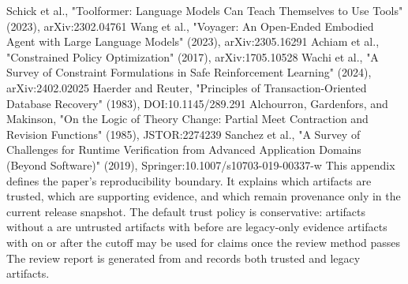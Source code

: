 \markdownRendererUlItem Schick et al., "Toolformer: Language Models Can Teach Themselves to Use Tools" (2023), arXiv:2302.04761\markdownRendererUlItemEnd 
\markdownRendererUlItem Wang et al., "Voyager: An Open-Ended Embodied Agent with Large Language Models" (2023), arXiv:2305.16291\markdownRendererUlItemEnd 
\markdownRendererUlItem Achiam et al., "Constrained Policy Optimization" (2017), arXiv:1705.10528\markdownRendererUlItemEnd 
\markdownRendererUlItem Wachi et al., "A Survey of Constraint Formulations in Safe Reinforcement Learning" (2024), arXiv:2402.02025\markdownRendererUlItemEnd 
\markdownRendererUlItem Haerder and Reuter, "Principles of Transaction-Oriented Database Recovery" (1983), DOI:10.1145/289.291\markdownRendererUlItemEnd 
\markdownRendererUlItem Alchourron, Gardenfors, and Makinson, "On the Logic of Theory Change: Partial Meet Contraction and Revision Functions" (1985), JSTOR:2274239\markdownRendererUlItemEnd 
\markdownRendererUlItem Sanchez et al., "A Survey of Challenges for Runtime Verification from Advanced Application Domains (Beyond Software)" (2019), Springer:10.1007/s10703-019-00337-w\markdownRendererUlItemEnd 
\markdownRendererUlEndTight \markdownRendererInterblockSeparator
{}
\markdownRendererSectionEnd \markdownRendererSectionBegin
{}\markdownRendererInterblockSeparator
{}This appendix defines the paper's reproducibility boundary.\markdownRendererSoftLineBreak
{}It explains which artifacts are trusted, which are supporting evidence, and which remain provenance only in the current release snapshot.\markdownRendererInterblockSeparator
{}\markdownRendererSectionBegin
{}\markdownRendererInterblockSeparator
{}The default trust policy is conservative:\markdownRendererInterblockSeparator
{}\markdownRendererUlBeginTight
\markdownRendererUlItem artifacts without a  are untrusted\markdownRendererUlItemEnd 
\markdownRendererUlItem artifacts with  before  are legacy-only evidence\markdownRendererUlItemEnd 
\markdownRendererUlItem artifacts with  on or after the cutoff may be used for claims once the review method passes\markdownRendererUlItemEnd 
\markdownRendererUlEndTight \markdownRendererInterblockSeparator
{}The review report is generated from  and records both trusted and legacy artifacts.\markdownRendererInterblockSeparator
